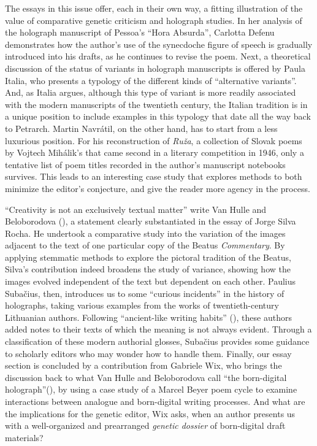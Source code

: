 The essays in this issue offer, each in their own way, a fitting illustration of the value of comparative genetic criticism and holograph studies. In her analysis of the holograph manuscript of Pessoa's ``Hora Absurda'', Carlotta Defenu demonstrates how the author's use of the synecdoche figure of speech is gradually introduced into his drafts, as he continues to revise the poem. Next, a theoretical discussion of the status of variants in holograph manuscripts is offered by Paula Italia, who presents a typology of the different kinds of ``alternative variants''. And, as Italia argues, although this type of variant is more readily associated with the modern manuscripts of the twentieth century, the Italian tradition is in a unique position to include examples in this typology that date all the way back to Petrarch. Martin Navrátil, on the other hand, has to start from a less luxurious position. For his reconstruction of \textit{Ruža}, a collection of Slovak poems by Vojtech Mihálik's that came second in a literary competition in 1946, only a tentative list of poem titles recorded in the author's manuscript notebooks survives. This leads to an interesting case study that explores methods to both minimize the editor's conjecture, and give the reader more agency in the process.

``Creativity is not an exclusively textual matter'' write Van Hulle and Beloborodova (\pageref{qtVanhulle1}), a statement clearly substantiated in the essay of Jorge Silva Rocha. He undertook a comparative study into the variation of the images adjacent to the text of one particular copy of the Beatus \emph{Commentary}. By applying stemmatic methods to explore the pictoral tradition of the Beatus, Silva's contribution indeed broadens the study of variance, showing how the images evolved independent of the text but dependent on each other. Paulius Subačius, then, introduces us to some ``curious incidents'' in the history of holographs, taking various examples from the works of twentieth-century Lithuanian authors. Following ``ancient-like writing habits'' (\pageref{qtSubacius}), these authors added notes to their texts of which the meaning is not always evident. Through a classification of these modern authorial glosses, Subačius provides some guidance to scholarly editors who may wonder how to handle them. Finally, our essay section is concluded by a contribution from Gabriele Wix, who brings the discussion back to what Van Hulle and Beloborodova call ``the born-digital holograph''(\pageref{qtVanhulle3}), by using a case study of a Marcel Beyer poem cycle to examine interactions between analogue and born-digital writing processes. And what are the implications for the genetic editor, Wix asks, when an author presents us with a well-organized and prearranged \textit{genetic dossier} of born-digital draft materials?

